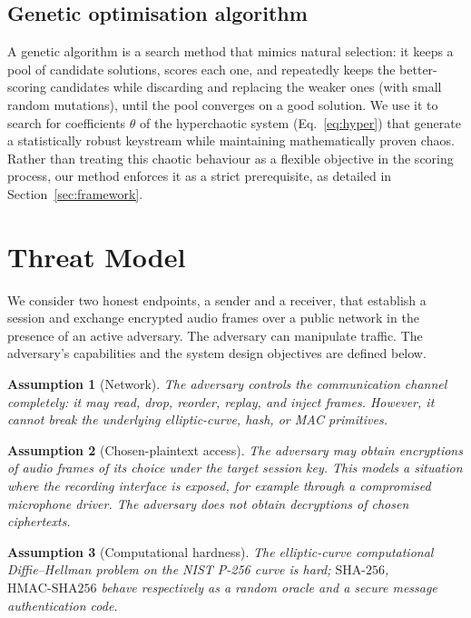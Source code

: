 \documentclass[pdflatex,sn-mathphys-num]{sn-jnl}%
\theoremstyle{thmstyleone}%
\newtheorem{assumption}{Assumption}%
\theoremstyle{thmstyletwo}%
\theoremstyle{thmstylethree}%
\begin{document}
\subsection{Genetic optimisation algorithm}
\label{sec:ga}
A genetic algorithm is a search method that mimics natural selection: it keeps a
pool of candidate solutions, scores each one, and repeatedly keeps the
better-scoring candidates while discarding and replacing the weaker ones (with
small random mutations), until the pool converges on a good solution. We use it
to search for coefficients $\theta$ of the hyperchaotic system (Eq.~\eqref{eq:hyper})
that generate a statistically robust keystream while maintaining mathematically proven chaos. Rather than treating this chaotic behaviour as a flexible objective in the scoring process, our method enforces it as a strict prerequisite, as detailed in Section~\ref{sec:framework}.

\section{Threat Model}
\label{sec:threat}

We consider two honest endpoints, a sender and a receiver, that establish a session and exchange encrypted audio frames over a public network in the presence of an active adversary. The adversary can manipulate traffic. The adversary's capabilities and the system design objectives are defined below.

\begin{assumption}[Network]
\label{as:net}
The adversary controls the communication channel completely: it may read, drop, reorder, replay, and inject frames. However, it cannot break the underlying elliptic-curve, hash, or MAC primitives.
\end{assumption}

\begin{assumption}[Chosen-plaintext access]
\label{as:cpa}
The adversary may obtain encryptions of audio frames of its choice under the target session key. This models a situation where the recording interface is exposed, for example through a compromised microphone driver. The adversary does \emph{not} obtain decryptions of chosen ciphertexts.
\end{assumption}

\begin{assumption}[Computational hardness]
\label{as:hard}
The elliptic-curve computational Diffie--Hellman problem on the NIST P-256 curve is hard; $\mathrm{SHA\text{-}256}$, $\mathrm{HMAC\text{-}SHA256}$ behave respectively as a random oracle and a secure message authentication code.
\end{assumption}
\end{document}
